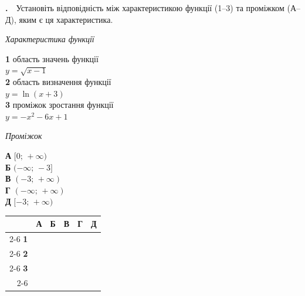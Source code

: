 \documentclass[12pt]{article}
\newcommand{\matchingGrid}{%
    \begingroup
    \renewcommand{\arraystretch}{1.15}
    \setlength{\tabcolsep}{4pt}
    \footnotesize
    \begin{tabular}{r|c|c|c|c|c|}
         \multicolumn{1}{c}{} & \multicolumn{1}{c}{\textbf{А}} & \multicolumn{1}{c}{\textbf{Б}} & \multicolumn{1}{c}{\textbf{В}} & \multicolumn{1}{c}{\textbf{Г}} & \multicolumn{1}{c}{\textbf{Д}} \\ \cline{2-6}
         \textbf{1} & \phantom{X} & \phantom{X} & \phantom{X} & \phantom{X} & \phantom{X} \\ \cline{2-6}
         \textbf{2} & & & & & \\ \cline{2-6}
         \textbf{3} & & & & & \\ \cline{2-6}
    \end{tabular}
    \endgroup
}
\newcounter{zad}
\newcommand{\zadtask}[1]{\stepcounter{zad}\noindent\textbf{\thezad.}\ \ #1\par\vspace{0.2cm}}
\begin{document}
\zadtask{Установіть відповідність між характеристикою функції (1--3) та проміжком (А--Д), яким є ця характеристика.

\vspace{0.2cm}
\noindent
\begin{minipage}[t]{0.45\textwidth}
\textit{Характеристика функції}\par\vspace{0.15cm}
\textbf{1} \quad область значень функції\\ $y = \sqrt{x-1}$\\[0.25cm]
\textbf{2} \quad область визначення функції \\$y = \ln(x+3)$\\[0.25cm]
\textbf{3} \quad проміжок зростання функції\\ $y = -x^2 - 6x + 1$
\end{minipage}
\hfill
\begin{minipage}[t]{0.3\textwidth}
\textit{Проміжок}\par\vspace{0.15cm}
\textbf{А} \quad $[0;\, +\infty)$\\[0.15cm]
\textbf{Б} \quad $(-\infty;\, -3]$\\[0.15cm]
\textbf{В} \quad $(-3;\, +\infty)$\\[0.15cm]
\textbf{Г} \quad $(-\infty;\, +\infty)$\\[0.15cm]
\textbf{Д} \quad $[-3;\, +\infty)$
\end{minipage}
\hfill
\begin{minipage}[t]{0.2\textwidth}
\vspace{0.4cm}
\begin{flushright}\matchingGrid\end{flushright}
\end{minipage}
}
\end{document}
